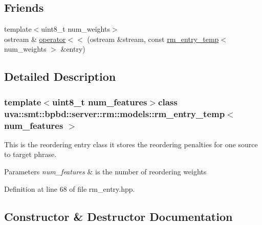 \subsection*{Friends}
\begin{DoxyCompactItemize}
\item 
{\footnotesize template$<$uint8\+\_\+t num\+\_\+weights$>$ }\\ostream \& \hyperlink{classuva_1_1smt_1_1bpbd_1_1server_1_1rm_1_1models_1_1rm__entry__temp_adf90c7755a71fef5bd55fb6c1caad51a}{operator$<$$<$} (ostream \&stream, const \hyperlink{classuva_1_1smt_1_1bpbd_1_1server_1_1rm_1_1models_1_1rm__entry__temp}{rm\+\_\+entry\+\_\+temp}$<$ num\+\_\+weights $>$ \&entry)
\end{DoxyCompactItemize}


\subsection{Detailed Description}
\subsubsection*{template$<$uint8\+\_\+t num\+\_\+features$>$class uva\+::smt\+::bpbd\+::server\+::rm\+::models\+::rm\+\_\+entry\+\_\+temp$<$ num\+\_\+features $>$}

This is the reordering entry class it stores the reordering penalties for one source to target phrase. 
\begin{DoxyParams}{Parameters}
{\em num\+\_\+features} & is the number of reordering weights \\
\hline
\end{DoxyParams}


Definition at line 68 of file rm\+\_\+entry.\+hpp.



\subsection{Constructor \& Destructor Documentation}
\hypertarget{classuva_1_1smt_1_1bpbd_1_1server_1_1rm_1_1models_1_1rm__entry__temp_a6884470729968c0a97cb9a96b2741938}{}
